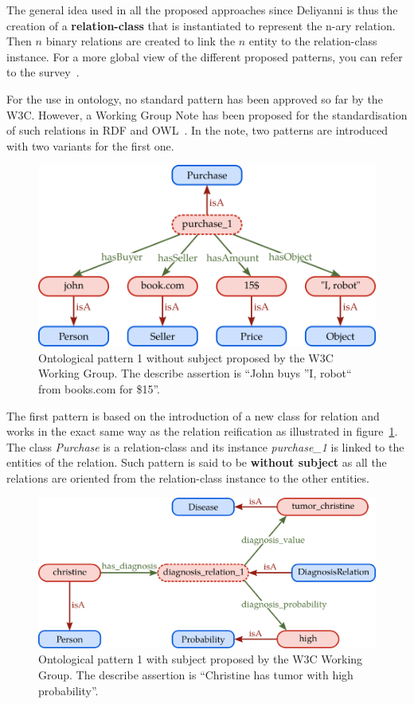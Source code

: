 The general idea used in all the proposed approaches since Deliyanni is thus the creation of a \textbf{relation-class} that is instantiated to represent the n-ary relation. Then $n$ binary relations are created to link the $n$ entity to the relation-class instance. For a more global view of the different proposed patterns, you can refer to the survey~\cite{gangemi_2013_multi}.

For the use in ontology, no standard pattern has been approved so far by the W3C. However, a Working Group Note has been proposed for the standardisation of such relations in RDF and OWL~\cite{w3c_2006_defining}. In the note, two patterns are introduced with two variants for the first one.

\begin{figure}[ht!]
\centering
\includegraphics[scale=0.4]{figures/chapter7/w3c_p2.png}
\caption{\label{fig:chap7_w3c_p2} Ontological pattern 1 without subject proposed by the W3C Working Group. The describe assertion is ``John buys ''I, robot`` from books.com for \$15''.}
\end{figure}

The first pattern is based on the introduction of a new class for relation and works in the exact same way as the relation reification as illustrated in figure~\ref{fig:chap7_w3c_p2}. The class \textit{Purchase} is a relation-class and its instance \textit{purchase\_1} is linked to the entities of the relation. Such pattern is said to be \textbf{without subject} as all the relations are oriented from the relation-class instance to the other entities.

\begin{figure}[ht!]
\centering
\includegraphics[scale=0.4]{figures/chapter7/w3c_p1.png}
\caption{\label{fig:chap7_w3c_p1} Ontological pattern 1 with subject proposed by the W3C Working Group. The describe assertion is ``Christine has tumor with high probability''.}
\end{figure}


